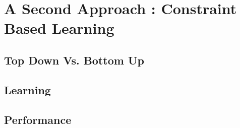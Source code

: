 \chapter{A Second Approach : Constraint Based Learning}

\section{Top Down Vs. Bottom Up}

\section{Learning}

\section{Performance}



\pagebreak
%
%